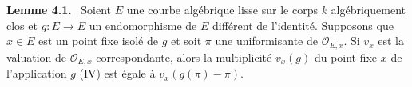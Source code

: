 \documentclass[11pt]{article}
\newenvironment{statement}[1]{\par\medskip\noindent\textbf{#1.}\ }{\par\medskip}
\begin{document}
\begin{statement}{Lemme 4.1}
Soient $E$ une courbe algébrique lisse sur le corps $k$ algébriquement clos et $g:E\to E$ un endomorphisme de $E$ différent de l'identité. Supposons que $x\in E$ est un point fixe isolé de $g$ et soit $\pi$ une uniformisante de $\mathcal O_{E,x}$. Si $v_x$ est la valuation de $\mathcal O_{E,x}$ correspondante, alors la multiplicité $v_x(g)$ du point fixe $x$ de l'application $g$ (IV) est égale à $v_x(g(\pi)-\pi)$.
\end{statement}
\end{document}
